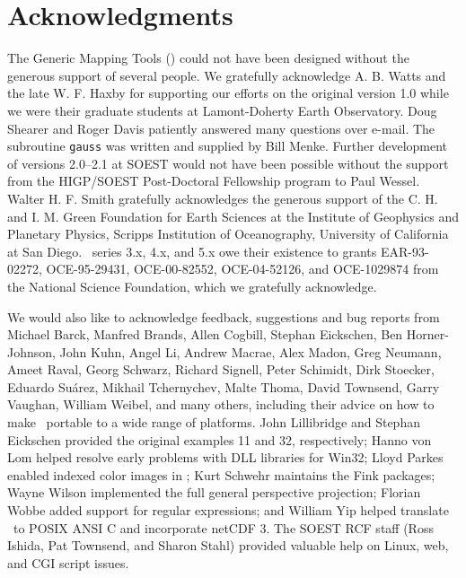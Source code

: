 %
%


\chapter*{Acknowledgments}

The Generic Mapping Tools (\GMT) could not have been designed without
the generous support of several people.  We gratefully acknowledge
A. B. Watts and the late W. F. Haxby for supporting our efforts on the original
version 1.0 while we were their graduate students at Lamont-Doherty
Earth Observatory.  Doug Shearer and Roger Davis patiently answered
many questions over e-mail.  The subroutine \texttt{gauss}
was written and supplied by Bill Menke.
Further development of versions 2.0--2.1 at SOEST would not have
been possible without the support from the HIGP/SOEST
Post-Doctoral Fellowship program to Paul Wessel.  Walter H. F. Smith
gratefully acknowledges the generous support of the C. H. and I. M.
Green Foundation for Earth Sciences at the Institute of Geophysics
and Planetary Physics, Scripps Institution of Oceanography, University
of California at San Diego.
\GMT\ series 3.x, 4.x, and 5.x owe their existence to grants
EAR-93-02272, OCE-95-29431, OCE-00-82552, OCE-04-52126, and OCE-1029874
from the National Science Foundation, which we gratefully acknowledge.

We would also like to acknowledge feedback, suggestions and bug reports
from
Michael Barck,
Manfred Brands,
Allen Cogbill,
Stephan Eickschen,
Ben Horner-Johnson,
John Kuhn,
Angel Li,
Andrew Macrae,
Alex Madon,
Greg Neumann,
Ameet Raval,
Georg Schwarz,
Richard Signell,
Peter Schimidt,
Dirk Stoecker,
Eduardo Su\'{a}rez,
Mikhail Tchernychev,
Malte Thoma,
David Townsend,
Garry Vaughan,
William Weibel,
and many others, including their advice
on how to make \GMT\ portable to a wide range of platforms.
John Lillibridge and Stephan Eickschen provided the original examples 11 and 32, respectively;
Hanno von Lom helped resolve early problems with DLL libraries for Win32;
Lloyd Parkes enabled indexed color images in \PS;
Kurt Schwehr maintains the \textsf{Fink} packages;
Wayne Wilson implemented the full general perspective projection;
Florian Wobbe added support for regular expressions;
and William Yip helped translate \GMT\ to POSIX ANSI C and incorporate netCDF 3.
The SOEST RCF staff (Ross Ishida, Pat Townsend, and Sharon Stahl) provided valuable help
on Linux, web, and CGI script issues.

